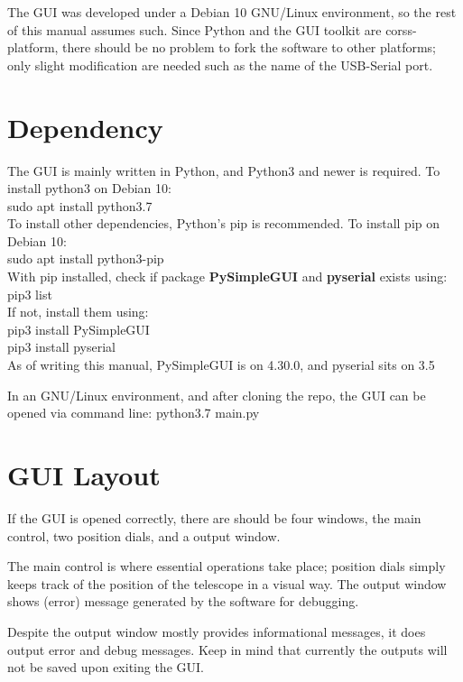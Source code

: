 \documentclass{article}
\begin{document}
The GUI was developed under a Debian 10 GNU/Linux environment, so the rest of this manual assumes such. Since Python and the GUI toolkit are corss-platform, there should be no problem to fork the software to other platforms; only slight modification are needed such as the name of the USB-Serial port.

\section{Dependency}

The GUI is mainly written in Python, and Python3 and newer is required. To install python3 on Debian 10:\\
sudo apt install python3.7\\

To install other dependencies, Python's pip is recommended. To install pip on Debian 10:\\
sudo apt install python3-pip\\

With pip installed, check if package \textbf{PySimpleGUI} and \textbf{pyserial} exists using:\\
pip3 list\\

If not, install them using:\\
pip3 install PySimpleGUI\\
pip3 install pyserial\\

As of writing this manual, PySimpleGUI is on 4.30.0, and pyserial sits on 3.5

In an GNU/Linux environment, and after cloning the repo, the GUI can be opened via command line: python3.7 main.py

\section{GUI Layout}

If the GUI is opened correctly, there are should be four windows, the main control, two position dials, and a output window.

The main control is where essential operations take place; position dials simply keeps track of the position of the telescope in a visual way. The output window shows (error) message generated by the software for debugging.

Despite the output window mostly provides informational messages, it does output error and debug messages. Keep in mind that currently the outputs will not be saved upon exiting the GUI.
\end{document}
